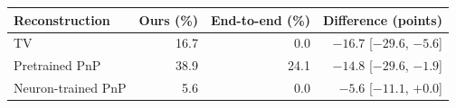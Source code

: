 \begin{tabular}{lrrr}
\toprule
Reconstruction & Ours (\%) & End-to-end (\%) & Difference (points) \\
\midrule
TV & 16.7 & 0.0 & $-16.7$ [$-29.6$, $-5.6$] \\
Pretrained PnP & 38.9 & 24.1 & $-14.8$ [$-29.6$, $-1.9$] \\
Neuron-trained PnP & 5.6 & 0.0 & $-5.6$ [$-11.1$, $+0.0$] \\
\bottomrule
\end{tabular}
